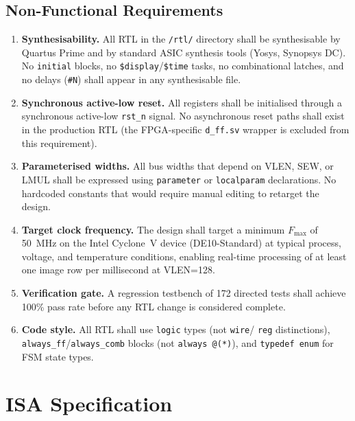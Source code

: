 \subsection{Non-Functional Requirements}

\begin{enumerate}[label=NF-\arabic*.]
  \item \textbf{Synthesisability.} All RTL in the \texttt{/rtl/} directory shall be
        synthesisable by Quartus Prime and by standard ASIC synthesis tools (Yosys,
        Synopsys DC). No \texttt{initial} blocks, no \texttt{\$display}/\texttt{\$time}
        tasks, no combinational latches, and no delays (\texttt{\#N}) shall appear in
        any synthesisable file.
  \item \textbf{Synchronous active-low reset.} All registers shall be initialised
        through a synchronous active-low \texttt{rst\_n} signal. No asynchronous reset
        paths shall exist in the production RTL (the FPGA-specific \texttt{d\_ff.sv}
        wrapper is excluded from this requirement).
  \item \textbf{Parameterised widths.} All bus widths that depend on VLEN, SEW, or
        LMUL shall be expressed using \texttt{parameter} or \texttt{localparam}
        declarations. No hardcoded constants that would require manual editing to
        retarget the design.
  \item \textbf{Target clock frequency.} The design shall target a minimum
        $F_\text{max}$ of 50~MHz on the Intel Cyclone~V device
        (DE10-Standard) \cite{de10standard} at typical process, voltage, and temperature
        conditions, enabling real-time processing of at least one image row per
        millisecond at VLEN=128.
  \item \textbf{Verification gate.} A regression testbench of 172 directed tests shall
        achieve 100\% pass rate before any RTL change is considered complete.
  \item \textbf{Code style.} All RTL shall use \texttt{logic} types (not \texttt{wire}/
        \texttt{reg} distinctions), \texttt{always\_ff}/\texttt{always\_comb} blocks
        (not \texttt{always @(*)}), and \texttt{typedef enum} for FSM state types.
\end{enumerate}

\section{ISA Specification}
\label{sec:isa-spec}

